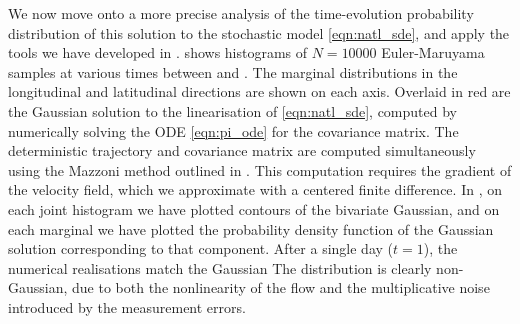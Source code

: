 We now move onto a more precise analysis of the time-evolution probability distribution of this solution to the stochastic model \cref{eqn:natl_sde}, and apply the tools we have developed in .
 shows histograms of \(N = 10000\) Euler-Maruyama samples at various times between  and .
The marginal distributions in the longitudinal and latitudinal directions are shown on each axis.
Overlaid in red are the Gaussian solution to the linearisation of \cref{eqn:natl_sde}, computed by numerically solving the ODE \cref{eqn:pi_ode} for the covariance matrix.
The deterministic trajectory and covariance matrix are computed simultaneously using the Mazzoni method outlined in .
This computation requires the gradient of the velocity field, which we approximate with a centered finite difference.
In , on each joint histogram we have plotted contours of the bivariate Gaussian, and on each marginal we have plotted the probability density function of the Gaussian solution corresponding to that component.
After a single day (\(t = 1\)), the numerical realisations match the Gaussian
The distribution is clearly non-Gaussian, due to both the nonlinearity of the flow and the multiplicative noise introduced by the measurement errors.





